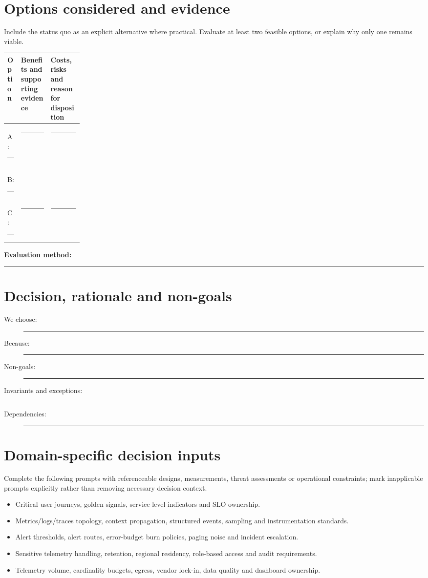 \documentclass[11pt,letterpaper]{article}
\newcommand{\BlankResponse}{\rule[-0.4em]{0pt}{2em}\rule{0.65\linewidth}{0.4pt}}
\begin{document}
\section{Options considered and evidence}
Include the status quo as an explicit alternative where practical. Evaluate
at least two feasible options, or explain why only one remains viable.
\par\noindent\begin{tabularx}{\linewidth}{@{}>{\raggedright\arraybackslash}p{0.18\linewidth}>{\raggedright\arraybackslash}X >{\raggedright\arraybackslash}X@{}}
\toprule
\textbf{Option} & \textbf{Benefits and supporting evidence} & \textbf{Costs, risks and reason for disposition}\\
\midrule
A: \BlankResponse & \BlankResponse & \BlankResponse\\
B: \BlankResponse & \BlankResponse & \BlankResponse\\
C: \BlankResponse & \BlankResponse & \BlankResponse\\
\bottomrule
\end{tabularx}\par

\noindent\textbf{Evaluation method:} \BlankResponse

\section{Decision, rationale and non-goals}
\begin{description}
\item[We choose:] \BlankResponse
\item[Because:] \BlankResponse
\item[Non-goals:] \BlankResponse
\item[Invariants and exceptions:] \BlankResponse
\item[Dependencies:] \BlankResponse
\end{description}

\section{Domain-specific decision inputs}
Complete the following prompts with referenceable designs, measurements,
threat assessments or operational constraints; mark inapplicable prompts
explicitly rather than removing necessary decision context.
\begin{itemize}
\item Critical user journeys, golden signals, service-level indicators and SLO ownership.
\item Metrics/logs/traces topology, context propagation, structured events, sampling and instrumentation standards.
\item Alert thresholds, alert routes, error-budget burn policies, paging noise and incident escalation.
\item Sensitive telemetry handling, retention, regional residency, role-based access and audit requirements.
\item Telemetry volume, cardinality budgets, egress, vendor lock-in, data quality and dashboard ownership.
\end{itemize}
\end{document}
